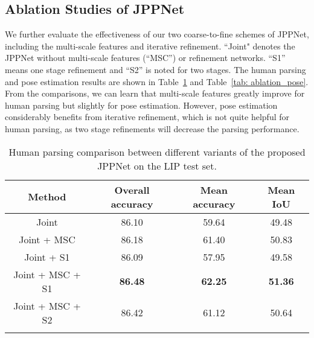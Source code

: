 \documentclass[10pt,journal,compsoc]{IEEEtran}
\begin{document}
\subsection{Ablation Studies of JPPNet}
We further evaluate the effectiveness of our two coarse-to-fine schemes of JPPNet, including the multi-scale features and iterative refinement. {``Joint" denotes the JPPNet without multi-scale features (``MSC'') or refinement networks. ``S1'' means one stage refinement and ``S2'' is noted for two stages.} The human parsing and pose estimation results are shown in Table~\ref{tab: ablation_parsing} and Table~\ref{tab: ablation_pose}. From the comparisons, we can learn that multi-scale features greatly improve for human parsing but slightly for pose estimation. However, pose estimation considerably benefits from iterative refinement, which is not quite helpful for human parsing, as two stage refinements will decrease the parsing performance.


\begin{table}[t]
\centering
\scriptsize
\caption{Human parsing comparison between different variants of the proposed JPPNet on the LIP test set.}
\vspace{-3mm}
\label{tab: ablation_parsing}
\begin{tabular}{cccc}
\toprule[0.7pt]
   Method               & Overall accuracy & Mean accuracy   & Mean IoU  \\ \hline 
   Joint                & 86.10            & 59.64           & 49.48     \\
   Joint + MSC          & 86.18            & 61.40           & 50.83     \\
   Joint + S1           & 86.09            & 57.95           & 49.58     \\ 
   Joint + MSC + S1     & \textbf{86.48}   & \textbf{62.25}  & \textbf{51.36}     \\ 
   Joint + MSC + S2     & 86.42            & 61.12           & 50.64     \\
\toprule[0.7pt]
\vspace{-2mm}
\end{tabular}
\end{table}
\end{document}
